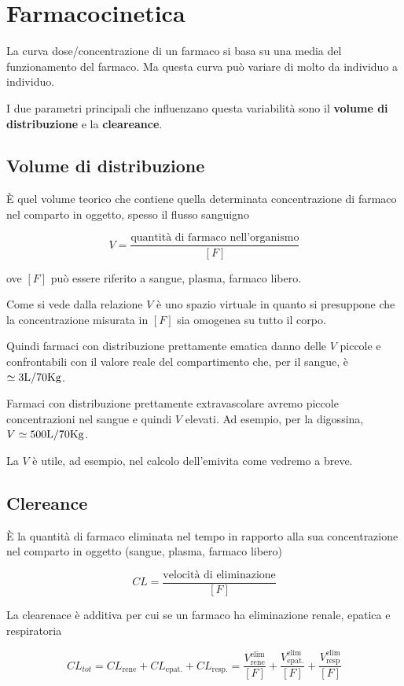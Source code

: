 \chapter{Farmacocinetica}

La curva dose/concentrazione di un farmaco si basa su una media del funzionamento del farmaco. Ma questa curva può variare di molto da individuo a individuo.

I due parametri principali che influenzano questa variabilità sono il \textbf{volume di distribuzione} e la \textbf{cleareance}.

\section{Volume di distribuzione}

\`E quel volume teorico che contiene quella determinata concentrazione di farmaco nel comparto in oggetto, spesso il flusso sanguigno

$$V =\frac{\text{quantità di farmaco nell'organismo}}{[F]}$$

ove $[F]$ può essere riferito a sangue, plasma, farmaco libero.

Come si vede dalla relazione $V$ è uno spazio virtuale in quanto si presuppone che la concentrazione misurata in $[F]$ sia omogenea su tutto il corpo.

Quindi farmaci con distribuzione prettamente ematica danno delle $V$ piccole e confrontabili con il valore reale del compartimento che, per il sangue, è $\simeq 3\ce{L}/70\ce{Kg}$.

Farmaci con distribuzione prettamente extravascolare avremo piccole concentrazioni nel sangue e quindi $V$ elevati. Ad esempio, per la digossina, $V \simeq 500\ce{L}/70\ce{Kg}$.

La $V$ è utile, ad esempio, nel calcolo dell'emivita come vedremo a breve.

\section{Clereance}

\`E la quantità di farmaco eliminata nel tempo in rapporto alla sua concentrazione nel comparto in oggetto (sangue, plasma, farmaco libero)

$$CL =\frac{\text{velocità di eliminazione}}{[F]}$$

La clearenace è additiva per cui se un farmaco ha eliminazione renale, epatica e respiratoria

$$ CL_{tot} = CL_{\text{rene}} + CL_{\text{epat.}} + CL_\text{resp.} = \frac{V_{\text{rene}}^{\text{elim}}}{[F]} + \frac{V_{\text{epat.}}^{\text{elim}}}{[F]} + \frac{V_{\text{resp}}^{\text{elim}}}{[F]}$$


